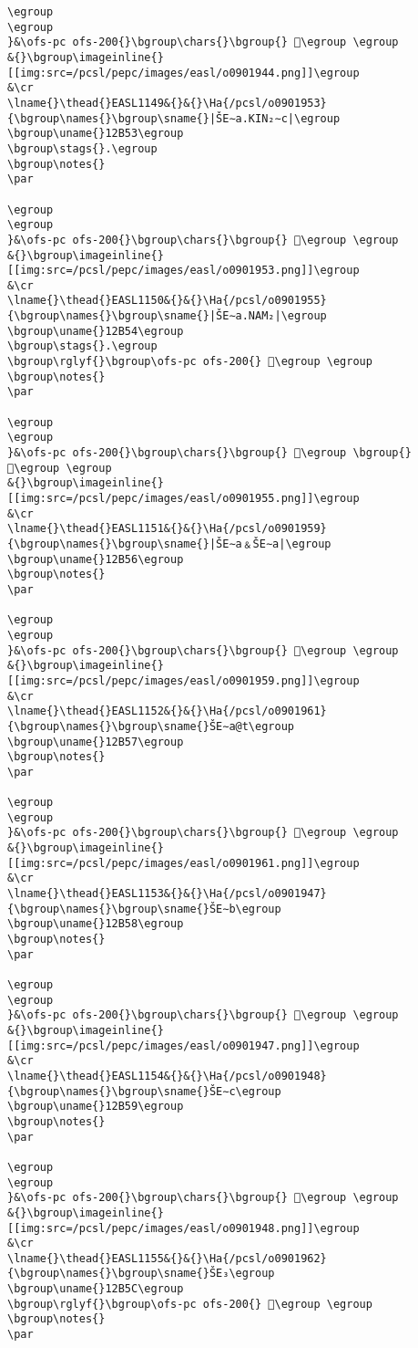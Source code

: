 \begin{verbatim}
\egroup
\egroup
}&\ofs-pc ofs-200{}\bgroup\chars{}\bgroup{} 𒭑\egroup \egroup
&{}\bgroup\imageinline{}[[img:src=/pcsl/pepc/images/easl/o0901944.png]]\egroup
&\cr
\lname{}\thead{}EASL1149&{}&{}\Ha{/pcsl/o0901953}{\bgroup\names{}\bgroup\sname{}|ŠE∼a.KIN₂∼c|\egroup
\bgroup\uname{}12B53\egroup
\bgroup\stags{}.\egroup
\bgroup\notes{}
\par 

\egroup
\egroup
}&\ofs-pc ofs-200{}\bgroup\chars{}\bgroup{} 𒭓\egroup \egroup
&{}\bgroup\imageinline{}[[img:src=/pcsl/pepc/images/easl/o0901953.png]]\egroup
&\cr
\lname{}\thead{}EASL1150&{}&{}\Ha{/pcsl/o0901955}{\bgroup\names{}\bgroup\sname{}|ŠE∼a.NAM₂|\egroup
\bgroup\uname{}12B54\egroup
\bgroup\stags{}.\egroup
\bgroup\rglyf{}\bgroup\ofs-pc ofs-200{} 𒭔\egroup \egroup
\bgroup\notes{}
\par 

\egroup
\egroup
}&\ofs-pc ofs-200{}\bgroup\chars{}\bgroup{} 𒭔\egroup \bgroup{} 𒭕\egroup \egroup
&{}\bgroup\imageinline{}[[img:src=/pcsl/pepc/images/easl/o0901955.png]]\egroup
&\cr
\lname{}\thead{}EASL1151&{}&{}\Ha{/pcsl/o0901959}{\bgroup\names{}\bgroup\sname{}|ŠE∼a﹠ŠE∼a|\egroup
\bgroup\uname{}12B56\egroup
\bgroup\notes{}
\par 

\egroup
\egroup
}&\ofs-pc ofs-200{}\bgroup\chars{}\bgroup{} 𒭖\egroup \egroup
&{}\bgroup\imageinline{}[[img:src=/pcsl/pepc/images/easl/o0901959.png]]\egroup
&\cr
\lname{}\thead{}EASL1152&{}&{}\Ha{/pcsl/o0901961}{\bgroup\names{}\bgroup\sname{}ŠE∼a@t\egroup
\bgroup\uname{}12B57\egroup
\bgroup\notes{}
\par 

\egroup
\egroup
}&\ofs-pc ofs-200{}\bgroup\chars{}\bgroup{} 𒭗\egroup \egroup
&{}\bgroup\imageinline{}[[img:src=/pcsl/pepc/images/easl/o0901961.png]]\egroup
&\cr
\lname{}\thead{}EASL1153&{}&{}\Ha{/pcsl/o0901947}{\bgroup\names{}\bgroup\sname{}ŠE∼b\egroup
\bgroup\uname{}12B58\egroup
\bgroup\notes{}
\par 

\egroup
\egroup
}&\ofs-pc ofs-200{}\bgroup\chars{}\bgroup{} 𒭘\egroup \egroup
&{}\bgroup\imageinline{}[[img:src=/pcsl/pepc/images/easl/o0901947.png]]\egroup
&\cr
\lname{}\thead{}EASL1154&{}&{}\Ha{/pcsl/o0901948}{\bgroup\names{}\bgroup\sname{}ŠE∼c\egroup
\bgroup\uname{}12B59\egroup
\bgroup\notes{}
\par 

\egroup
\egroup
}&\ofs-pc ofs-200{}\bgroup\chars{}\bgroup{} 𒭙\egroup \egroup
&{}\bgroup\imageinline{}[[img:src=/pcsl/pepc/images/easl/o0901948.png]]\egroup
&\cr
\lname{}\thead{}EASL1155&{}&{}\Ha{/pcsl/o0901962}{\bgroup\names{}\bgroup\sname{}ŠE₃\egroup
\bgroup\uname{}12B5C\egroup
\bgroup\rglyf{}\bgroup\ofs-pc ofs-200{} 𒭜\egroup \egroup
\bgroup\notes{}
\par 


\end{verbatim}

